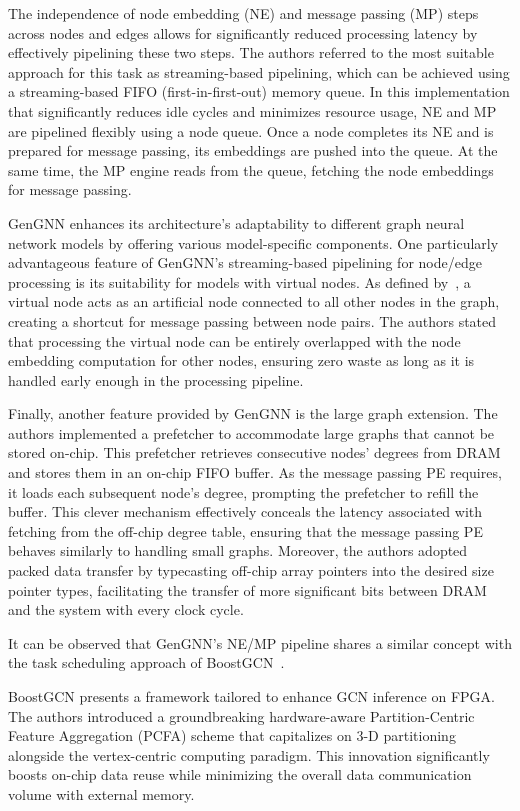 The independence of node embedding (NE) and message passing (MP) steps across nodes and edges allows for significantly reduced processing latency by effectively pipelining these two steps.
The authors referred to the most suitable approach for this task as streaming-based pipelining, which can be achieved using a streaming-based FIFO (first-in-first-out) memory queue.
In this implementation that significantly reduces idle cycles and minimizes resource usage, NE and MP are pipelined flexibly using a node queue.
Once a node completes its NE and is prepared for message passing, its embeddings are pushed into the queue.
At the same time, the MP engine reads from the queue, fetching the node embeddings for message passing.

GenGNN enhances its architecture's adaptability to different graph neural network models by offering various model-specific components.
One particularly advantageous feature of GenGNN's streaming-based pipelining for node/edge processing is its suitability for models with virtual nodes.
As defined by~\cite{DBLP:journals/corr/GilmerSRVD17}, a virtual node acts as an artificial node connected to all other nodes in the graph, creating a shortcut for message passing between node pairs.
The authors stated that processing the virtual node can be entirely overlapped with the node embedding computation for other nodes, ensuring zero waste as long as it is handled early enough in the processing pipeline.

Finally, another feature provided by GenGNN is the large graph extension.
The authors implemented a prefetcher to accommodate large graphs that cannot be stored on-chip.
This prefetcher retrieves consecutive nodes' degrees from DRAM and stores them in an on-chip FIFO buffer.
As the message passing PE requires, it loads each subsequent node's degree, prompting the prefetcher to refill the buffer.
This clever mechanism effectively conceals the latency associated with fetching from the off-chip degree table, ensuring that the message passing PE behaves similarly to handling small graphs.
Moreover, the authors adopted packed data transfer by typecasting off-chip array pointers into the desired size pointer types, facilitating the transfer of more significant bits between DRAM and the system with every clock cycle.

It can be observed that GenGNN's NE/MP pipeline shares a similar concept with the task scheduling approach of BoostGCN~\cite{9444065}.

BoostGCN presents a framework tailored to enhance GCN inference on FPGA. The authors introduced a groundbreaking hardware-aware Partition-Centric Feature Aggregation (PCFA) scheme that capitalizes on 3-D partitioning alongside the vertex-centric computing paradigm.
This innovation significantly boosts on-chip data reuse while minimizing the overall data communication volume with external memory.

